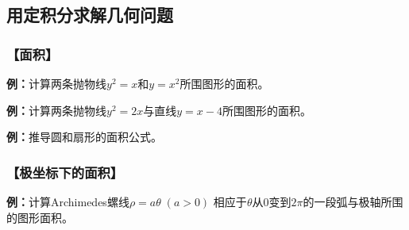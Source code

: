 \begin{center}
\end{center}

\subsection{用定积分求解几何问题}

\subsubsection{【面积】}

{\bf 例：}计算两条抛物线$y^2=x$和$y=x^2$所围图形的面积。

{\bf 例：}计算两条抛物线$y^2=2x$与直线$y=x-4$所围图形的面积。

{\bf 例：}推导圆和扇形的面积公式。

\subsubsection{【极坐标下的面积】}

{\bf 例：}计算Archimedes螺线$\rho=a\theta\;(a>0)$
相应于$\theta$从$0$变到$2\pi$的一段弧与极轴所围的图形面积。

